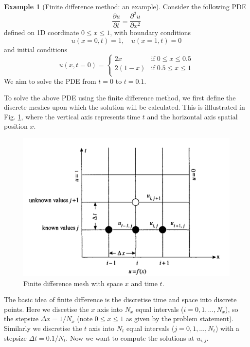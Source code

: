 \documentclass[a4paper,11pt]{article}
\theoremstyle{definition}
\newtheorem{exmp}{Example}[section]
\begin{document}
\begin{exmp}[Finite difference method: an example]

Consider the following PDE
\[	\frac{\partial u}{\partial t} = \frac{\partial^2 u}{\partial x^2} \] 
defined on 1D coordinate $0 \leq x \leq 1$, with boundary conditions
\[ u(x=0, t) = 1, \quad u(x=1, t) = 0 \]
and initial conditions
\[ u(x, t=0) = \left\{ \begin{array}{ll}
	2x & \textrm{if} \; 0 \leq x \leq 0.5 \\
	2(1-x) & \textrm{if} \; 0.5 \leq x \leq 1\\
	\end{array} \right.
\]
We aim to solve the PDE from $t=0$ to $t=0.1$.

To solve the above PDE using the finite difference method,
we first define the discrete meshes upon which the solution will be calculated.
This is illlustrated in Fig. \ref{fig:fdm_mesh}, where the vertical axis represents
time $t$ and the horizontal axis spatial position $x$.

\begin{figure} [!h]
 \begin{center}
	\includegraphics[width=.7\textwidth]{fdm_mesh}
 \end{center}
 \caption{Finite difference mesh with space $x$ and time $t$.} 
 \label{fig:fdm_mesh}
\end{figure}

The basic idea of finite difference is the discretise time and space into discrete points.
Here we discetise the $x$ axis into $N_x$ equal intervals ($i=0, 1, \ldots, N_x$), so the stepsize
$\Delta x = 1/N_x$ (note $0 \leq x \leq 1$ as given by the problem statement). Similarly we discretise
the $t$ axis into $N_t$ equal intervals ($j=0, 1, \ldots, N_t$) with a stepsize $\Delta t = 0.1/N_t$.
Now we want to compute the solutions at $u_{i,j}$.


\end{exmp}
\end{document}
